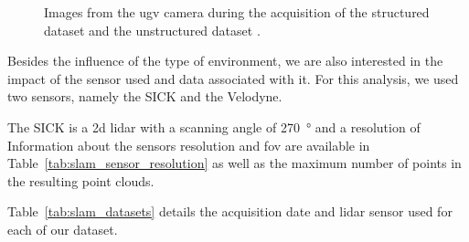 \begin{figure}[H]
    \centering
    \caption{Images from the \gls*{ugv} camera during the acquisition of the structured dataset \protect{} and the unstructured dataset \protect{}. }
    \label{fig:slam_views}
\end{figure}

Besides the influence of the type of environment, we are also interested in the impact of the sensor used and data associated with it. For this analysis, we used two sensors, namely the SICK and the Velodyne. 

The SICK is a \gls*{2d} \gls*{lidar} with a scanning angle of \SI{270}{\degree} and a resolution of 
Information about the sensors resolution and \gls*{fov} are available in Table~\ref{tab:slam_sensor_resolution} as well as the maximum number of points in the resulting point clouds. 

Table~\ref{tab:slam_datasets} details the acquisition date and \gls*{lidar} sensor used for each of our dataset.

